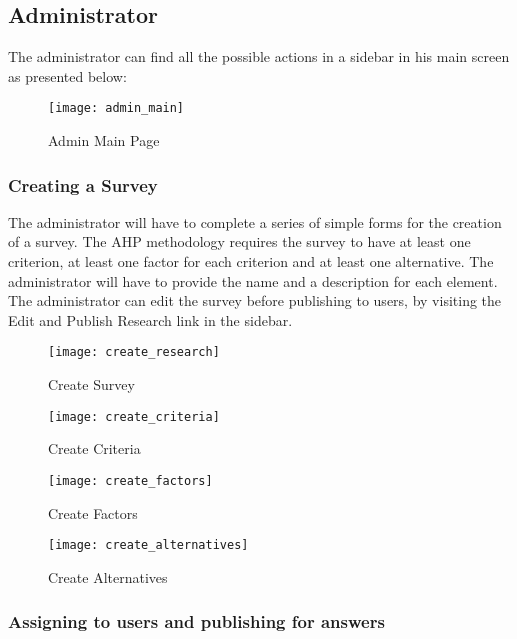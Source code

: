 \documentclass{article}
\begin{document}
\subsection*{Administrator}

The administrator can find all the possible actions in a sidebar in his main screen as presented below:

\begin{figure}[h!]
\centering
\texttt{[image: admin\_main]}
\caption{Admin Main Page}
\label{fig:admin_main}
\end{figure}


\subsubsection*{Creating a Survey}

The administrator will have to complete a series of simple forms for the creation of a survey. The AHP methodology requires the survey to have at least one criterion, at least one factor for each criterion and at least one alternative. The administrator will have to provide the name and a description for each element. The administrator can edit the survey before publishing to users, by visiting the Edit and Publish Research link in the sidebar.

\begin{figure}[h!]
\centering
\texttt{[image: create\_research]}
\caption{Create Survey}
\label{fig:create_survey}
\end{figure}

\begin{figure}[h!]
\centering
\texttt{[image: create\_criteria]}
\caption{Create Criteria}
\label{fig:create_criteria}
\end{figure}

\begin{figure}[h!]
\centering
\texttt{[image: create\_factors]}
\caption{Create Factors}
\label{fig:create_factors}
\end{figure}

\begin{figure}[h!]
\centering
\texttt{[image: create\_alternatives]}
\caption{Create Alternatives}
\label{fig:create_alternatives}
\end{figure}





\subsubsection*{Assigning to users and publishing for answers}
\end{document}
